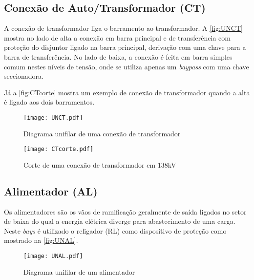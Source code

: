 		\subsection{Conexão de Auto/Transformador (CT)}
			A conexão de transformador liga o barramento ao transformador. A \autoref{fig:UNCT} mostra no lado de alta a conexão em barra principal e de transferência com proteção do disjuntor ligado na barra principal, derivação com uma chave para a barra de transferência. No lado de baixa, a conexão é feita em barra simples comum nestes níveis de tensão, onde se utiliza apenas um \textit{baypass} com uma chave seccionadora.\par
			Já a \autoref{fig:CTcorte} mostra um exemplo de conexão de transformador quando a alta é ligado aos dois barramentos.\par
			\begin{figure}[!b]
				\caption{Diagrama unifilar de uma conexão de transformador}
				\centering
				\texttt{[image: UNCT.pdf]}
				\label{fig:UNCT}
				\end{figure}
			\begin{figure}[!b]
				\caption{Corte de uma conexão de transformador em 138kV}
				\centering
				\texttt{[image: CTcorte.pdf]}
				\label{fig:CTcorte}
				\end{figure}
		\subsection{Alimentador (AL)}
			Os alimentadores são os vãos de ramificação geralmente de saída ligados no setor de baixa do qual a energia elétrica diverge para abastecimento de uma carga. Neste \textit{bays} é utilizado o religador (RL) como dispositivo de proteção como mostrado na \autoref{fig:UNAL}.\par
			\begin{figure}[!b]
				\caption{Diagrama unifilar de um alimentador}
				\centering
				\texttt{[image: UNAL.pdf]}
				\label{fig:UNAL}
				\end{figure}
